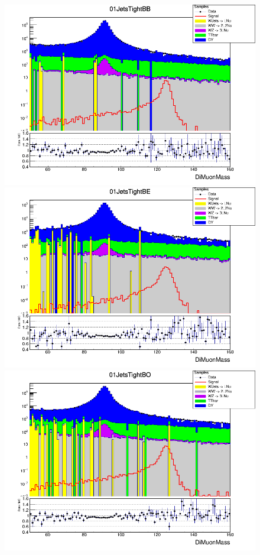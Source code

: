 \begin{figure}[H]
  \centering
  \includegraphics[width=0.65\linewidth]{figures/ch_higgs/distributions/baseline_kalman/distribution__01JetsTightBB__DiMuonMass__logY.png}\\
  \includegraphics[width=0.65\linewidth]{figures/ch_higgs/distributions/baseline_kalman/distribution__01JetsTightBE__DiMuonMass__logY.png}\\
  \includegraphics[width=0.65\linewidth]{figures/ch_higgs/distributions/baseline_kalman/distribution__01JetsTightBO__DiMuonMass__logY.png}
  \caption{}
  \label{fig:higgs_categorization_01jetstightbbbebo}
\end{figure}

